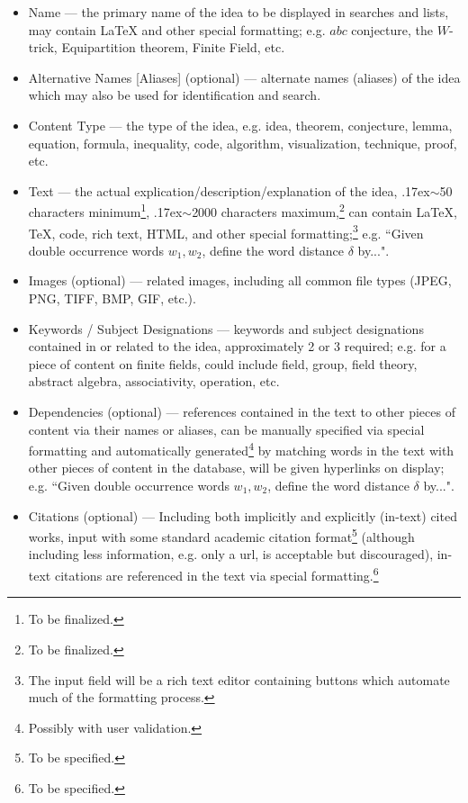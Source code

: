 \documentclass[12pt,letterpaper]{article}
\begin{document}
\begin{itemize}
\item Name --- the primary name of the idea to be displayed in searches and lists, may contain \LaTeX \textrm{ }and other special formatting; e.g. $abc$ conjecture, the $W$-trick, Equipartition theorem, Finite Field, etc.
\item Alternative Names [Aliases] (optional) --- alternate names (aliases) of the idea which may also be used for identification and search.
\item Content Type --- the type of the idea, e.g. idea, theorem, conjecture, lemma, equation, formula, inequality, code, algorithm, visualization, technique, proof, etc.
\item Text --- the actual explication/description/explanation of the idea, {\raise.17ex\hbox{$\scriptstyle\mathtt{\sim}$}}50 characters minimum\footnote{To be finalized.}, {\raise.17ex\hbox{$\scriptstyle\mathtt{\sim}$}}2000 characters maximum,\footnote{To be finalized.} can contain \LaTeX, \TeX, code, rich text, HTML, and other special formatting;\footnote{The input field will be a rich text editor containing buttons which automate much of the formatting process.} e.g. ``Given double occurrence words $w_{1}, w_{2}$, define the word distance $\delta$ by...".
\item Images (optional) --- related images, including all common file types (JPEG, PNG, TIFF, BMP, GIF, etc.).
\item Keywords / Subject Designations --- keywords and subject designations contained in or related to the idea, approximately 2 or 3 required; e.g. for a piece of content on finite fields, could include field, group, field theory, abstract algebra, associativity, operation, etc.
\item Dependencies (optional) --- references contained in the text to other pieces of content via their names or aliases, can be manually specified via special formatting and automatically generated\footnote{Possibly with user validation.} by matching words in the text  with other pieces of content in the database, will be given hyperlinks on display; e.g. ``Given {\color{blue} double occurrence words} $w_{1}, w_{2}$, define the word distance $\delta$ by...".
\item Citations (optional) --- Including both implicitly and explicitly (in-text) cited works, input with some standard academic citation format\footnote{To be specified.} (although including less information, e.g. only a url, is acceptable but discouraged), in-text citations are referenced in the text via special formatting.\footnote{To be specified.}
\end{itemize}
\end{document}
